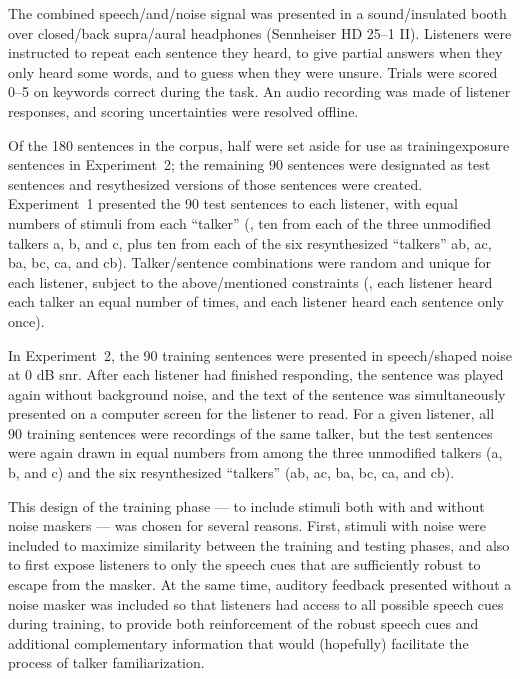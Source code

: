 The combined speech\-/and\-/noise signal was presented in a sound\-/insulated booth over closed\-/back supra\-/aural headphones (Sennheiser HD 25–1 II).  Listeners were instructed to repeat each sentence they heard, to give partial answers when they only heard some words, and to guess when they were unsure.  Trials were scored 0–5 on keywords correct during the task.  An audio recording was made of listener responses, and scoring uncertainties were resolved offline.  

Of the 180 sentences in the corpus, half were set aside for use as training\slsh{}exposure sentences in Experiment~2; the remaining 90 sentences were designated as test sentences and resythesized versions of those sentences were created.  Experiment~1 presented the 90 test sentences to each listener, with equal numbers of stimuli from each “talker” (\ie, ten from each of the three unmodified talkers \ac{a}, \ac{b}, and \ac{c}, plus ten from each of the six resynthesized “talkers” \ac{ab}, \ac{ac}, \ac{ba}, \ac{bc}, \ac{ca}, and \ac{cb}).  Talker\-/sentence combinations were random and unique for each listener, subject to the above\-/mentioned constraints (\ie, each listener heard each talker an equal number of times, and each listener heard each sentence only once).

In Experiment~2, the 90 training sentences were presented in speech\-/shaped noise at 0 dB \ac{snr}.  After each listener had finished responding, the sentence was played again without background noise, and the text of the sentence was simultaneously presented on a computer screen for the listener to read.  For a given listener, all 90 training sentences were recordings of the same talker, but the test sentences were again drawn in equal numbers from among the three unmodified talkers (\ac{a}, \ac{b}, and \ac{c}) and the six resynthesized “talkers” (\ac{ab}, \ac{ac}, \ac{ba}, \ac{bc}, \ac{ca}, and \ac{cb}).

This design of the training phase — to include stimuli both with and without noise maskers — was chosen for several reasons.  First, stimuli with noise were included to maximize similarity between the training and testing phases, and also to first expose listeners to only the speech cues that are sufficiently robust to escape from the masker.  At the same time, auditory feedback presented without a noise masker was included so that listeners had access to all possible speech cues during training, to provide both reinforcement of the robust speech cues and additional complementary information that would (hopefully) facilitate the process of talker familiarization.

